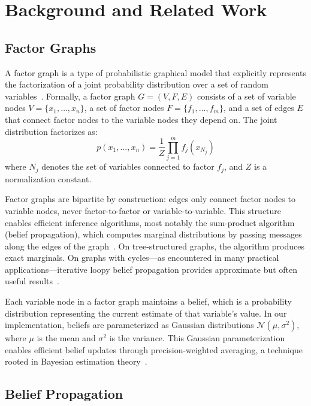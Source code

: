 \documentclass[journal]{IEEEtran}
\begin{document}
\section{Background and Related Work}

\subsection{Factor Graphs}

A factor graph is a type of probabilistic graphical model that explicitly represents the factorization of a joint probability distribution over a set of random variables~\cite{ref2}. Formally, a factor graph $G = (V, F, E)$ consists of a set of variable nodes $V = \{x_1, \ldots, x_n\}$, a set of factor nodes $F = \{f_1, \ldots, f_m\}$, and a set of edges $E$ that connect factor nodes to the variable nodes they depend on. The joint distribution factorizes as:
\begin{equation}
p(x_1, \ldots, x_n) = \frac{1}{Z} \prod_{j=1}^{m} f_j(x_{N_j})
\end{equation}
where $N_j$ denotes the set of variables connected to factor $f_j$, and $Z$ is a normalization constant.

Factor graphs are bipartite by construction: edges only connect factor nodes to variable nodes, never factor-to-factor or variable-to-variable. This structure enables efficient inference algorithms, most notably the sum-product algorithm (belief propagation), which computes marginal distributions by passing messages along the edges of the graph~\cite{ref2}. On tree-structured graphs, the algorithm produces exact marginals. On graphs with cycles---as encountered in many practical applications---iterative loopy belief propagation provides approximate but often useful results~\cite{ref3}.

Each variable node in a factor graph maintains a belief, which is a probability distribution representing the current estimate of that variable's value. In our implementation, beliefs are parameterized as Gaussian distributions $\mathcal{N}(\mu, \sigma^2)$, where $\mu$ is the mean and $\sigma^2$ is the variance. This Gaussian parameterization enables efficient belief updates through precision-weighted averaging, a technique rooted in Bayesian estimation theory~\cite{ref3}.

\subsection{Belief Propagation}
\end{document}
